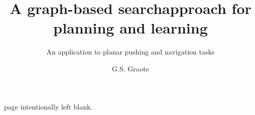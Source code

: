 \documentclass{layout/tudelft-report}
\begin{document}
\frontmatter

\title{A graph-based search\newline approach for planning and learning}

\subtitle{An application to planar pushing and navigation tasks} 

\author{G.S. Groote}
\subject{SC52045: System \& Control Thesis Report}

%
\makecover
page intentionally left blank.
\newpage




\tableofcontents
\listoffigures
\listoftables

\printunsrtglossary[type=symbols,style=long]

\mainmatter







%


\setcounter{biburlnumpenalty}{7000}
\setcounter{biburllcpenalty}{7000}
\setcounter{biburlucpenalty}{7000}

\printbibliography[heading=bibintoc,title=References]


\end{document}
